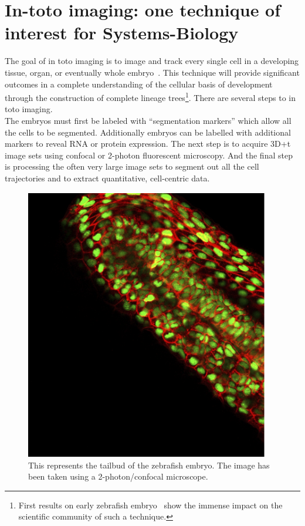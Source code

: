 \section{In-toto imaging: one technique of interest for Systems-Biology}

The goal of in toto imaging is to image and track every single cell in a
developing tissue, organ, or eventually
whole embryo~\cite{megason2003digitizing}. This technique will provide
significant outcomes in a complete understanding of the cellular basis of
development through the construction of complete lineage trees\footnote{First
results on early zebrafish embryo~\cite{olivier2010cell} show the immense impact
on the scientific community of such a technique.}. There are several steps to in
toto imaging.\\

The embryos must first be labeled with “segmentation markers” which allow all
the cells to be segmented. Additionally embryos can be labelled with additional
markers to reveal RNA or protein expression. The next step is to acquire 3D+t
image sets using confocal or 2-photon fluorescent microscopy. And the final step
is processing the often very large image sets to segment out all the cell
trajectories and to extract quantitative, cell-centric data.

\begin{figure}[htb]
\begin{center}
\leavevmode
 \includegraphics[width=0.95\textwidth]{pictures/embryoConfocalPic}
\end{center}
\caption{This represents the tailbud of the zebrafish embryo. The image has been taken using a 2-photon/confocal microscope.}
\label{fig:zebraconfoc}
\end{figure}

